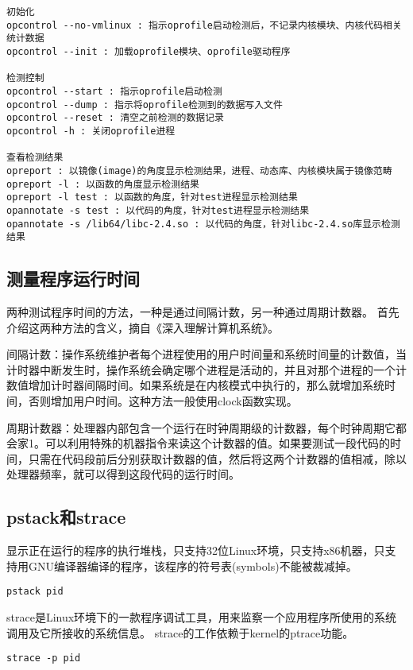 \begin{verbatim}
初始化
opcontrol --no-vmlinux : 指示oprofile启动检测后，不记录内核模块、内核代码相关统计数据
opcontrol --init : 加载oprofile模块、oprofile驱动程序

检测控制
opcontrol --start : 指示oprofile启动检测
opcontrol --dump : 指示将oprofile检测到的数据写入文件
opcontrol --reset : 清空之前检测的数据记录
opcontrol -h : 关闭oprofile进程

查看检测结果
opreport : 以镜像(image)的角度显示检测结果，进程、动态库、内核模块属于镜像范畴
opreport -l : 以函数的角度显示检测结果
opreport -l test : 以函数的角度，针对test进程显示检测结果
opannotate -s test : 以代码的角度，针对test进程显示检测结果
opannotate -s /lib64/libc-2.4.so : 以代码的角度，针对libc-2.4.so库显示检测结果
\end{verbatim}

\subsection{测量程序运行时间}
两种测试程序时间的方法，一种是通过间隔计数，另一种通过周期计数器。
首先介绍这两种方法的含义，摘自《深入理解计算机系统》。

间隔计数：操作系统维护者每个进程使用的用户时间量和系统时间量的计数值，当计时器中断发生时，操作系统会确定哪个进程是活动的，并且对那个进程的一个计数值增加计时器间隔时间。如果系统是在内核模式中执行的，那么就增加系统时间，否则增加用户时间。这种方法一般使用clock函数实现。

周期计数器：处理器内部包含一个运行在时钟周期级的计数器，每个时钟周期它都会家1。可以利用特殊的机器指令来读这个计数器的值。如果要测试一段代码的时间，只需在代码段前后分别获取计数器的值，然后将这两个计数器的值相减，除以处理器频率，就可以得到这段代码的运行时间。

\subsection{pstack和strace}
显示正在运行的程序的执行堆栈，只支持32位Linux环境，只支持x86机器，只支持用GNU编译器编译的程序，该程序的符号表(symbols)不能被裁减掉。

\begin{verbatim}
pstack pid
\end{verbatim}


strace是Linux环境下的一款程序调试工具，用来监察一个应用程序所使用的系统调用及它所接收的系统信息。
strace的工作依赖于kernel的ptrace功能。

\begin{verbatim}
strace -p pid
\end{verbatim}

























